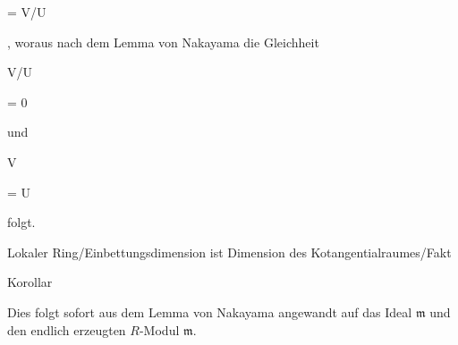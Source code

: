 {{{ = }{ V/U
}

{  }{
}

{    }{
}

{   }{
}

}
{}{}{,}
woraus
nach dem Lemma von Nakayama
die Gleichheit


\mavergleichskette

{\vergleichskette

{V/U
}

{ = }{ 0
}

{  }{
}

{    }{
}

{   }{
}

}
{}{}{}
und


\mavergleichskette

{\vergleichskette

{V
}

{ = }{ U
}

{  }{
}

{    }{
}

{   }{
}

}
{}{}{}
folgt.


}



{Lokaler Ring/Einbettungsdimension ist Dimension des Kotangentialraumes/Fakt}

{Korollar}

{}

{


\faktsituation {}



\faktzusatz {}

\faktzusatz {}


}

{


Dies folgt sofort aus
dem Lemma von Nakayama
angewandt auf das Ideal ${\mathfrak m}$ und den endlich erzeugten $R$-Modul ${\mathfrak m}$.


}


